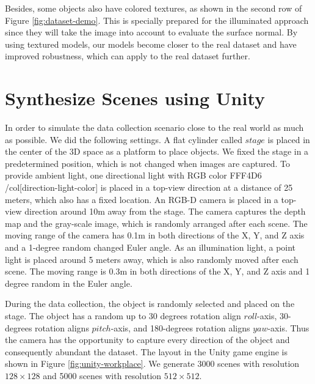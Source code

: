 Besides, some objects also have colored textures, as shown in the second row of Figure \ref{fig:dataset-demo}. This is specially prepared for the illuminated approach since they will take the image into account to evaluate the surface normal. By using textured models, our models become closer to the real dataset and have improved robustness, which can apply to the real dataset further.



\newcommand{\col}[1]{%
	\textcolor{#1}{\vrule width 0.5cm}}
\section{Synthesize Scenes using Unity}
In order to simulate the data collection scenario close to the real world as much as possible. We did the following settings. A flat cylinder called $ stage $ is placed in the center of the 3D space as a platform to place objects. We fixed the stage in a predetermined position, which is not changed when images are captured. 
To provide ambient light, one directional light with RGB color FFF4D6 /col[direction-light-color] is placed in a top-view direction at a distance of 25 meters, which also has a fixed location.
An RGB-D camera is placed in a top-view direction around 10m away from the stage. The camera captures the depth map and the gray-scale image, which is randomly arranged after each scene. The moving range of the camera has 0.1m in both directions of the X, Y, and Z axis and a 1-degree random changed Euler angle. 
As an illumination light, a point light is placed around 5 meters away, which is also randomly moved after each scene. The moving range is 0.3m in both directions of the X, Y, and Z axis and 1 degree random in the Euler angle.

During the data collection, the object is randomly selected and placed on the stage. The object has a random up to 30 degrees rotation align $ roll $-axis, 30-degrees rotation aligns $ pitch $-axis, and 180-degrees rotation aligns $ yaw $-axis. Thus the camera has the opportunity to capture every direction of the object and consequently abundant the dataset. The layout in the Unity game engine is shown in Figure \ref{fig:unity-workplace}. We generate 3000 scenes with resolution $ 128\times128 $ and 5000 scenes with resolution $ 512\times512 $.


